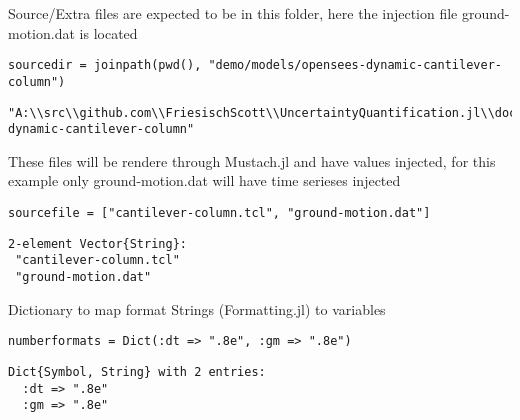 Source/Extra files are expected to be in this folder, here the injection file ground-motion.dat is located




\begin{verbatim}
sourcedir = joinpath(pwd(), "demo/models/opensees-dynamic-cantilever-column")
\end{verbatim}


\begin{verbatim}
"A:\\src\\github.com\\FriesischScott\\UncertaintyQuantification.jl\\docs\\build\\examples\\demo/models/opensees-dynamic-cantilever-column"
\end{verbatim}



These files will be rendere through Mustach.jl and have values injected, for this example only ground-motion.dat will have time serieses injected




\begin{verbatim}
sourcefile = ["cantilever-column.tcl", "ground-motion.dat"]
\end{verbatim}


\begin{verbatim}
2-element Vector{String}:
 "cantilever-column.tcl"
 "ground-motion.dat"
\end{verbatim}



Dictionary to map format Strings (Formatting.jl) to variables




\begin{verbatim}
numberformats = Dict(:dt => ".8e", :gm => ".8e")
\end{verbatim}


\begin{verbatim}
Dict{Symbol, String} with 2 entries:
  :dt => ".8e"
  :gm => ".8e"
\end{verbatim}



